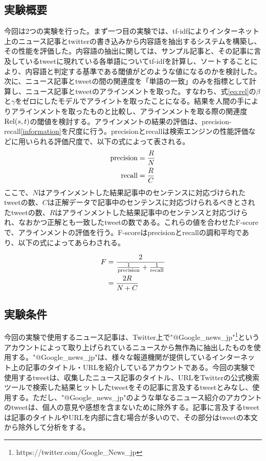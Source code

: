 \documentclass[12pt]{jarticle}
\begin{document}
\subsection{実験概要}
今回は2つの実験を行った。まず一つ目の実験では、tf-idfによりインターネット上のニュース記事とtwitterの書き込みから内容語を抽出するシステムを構築し、その性能を評価した。内容語の抽出に関しては、サンプル記事と、その記事に言及しているtweetに現れている各単語についてtf-idfを計算し、ソートすることにより、内容語と判定する基準である閾値がどのような値になるのかを検討した。次に、ニュース記事とtweetの間の関連度を「単語の一致」のみを指標として計算し、ニュース記事とtweetのアラインメントを取った。すなわち、式\ref{eq:rel}の$\beta$と$\gamma$をゼロにしたモデルでアライントを取ったことになる。結果を人間の手によりアラインメントを取ったものと比較し、アラインメントを取る際の関連度${\rm Rel}(s, t)$の閾値を検討する。アラインメントの結果の評価は、precision-recall\ref{information}を尺度に行う。precisionとrecallは検索エンジンの性能評価などに用いられる評価尺度で、以下の式によって表される。
\begin{align}
  {\rm precision} &= \frac{R}{N}\\
  {\rm recall} &= \frac{R}{C}
\end{align}
  ここで、$N$はアラインメントした結果記事中のセンテンスに対応づけられたtweetの数、$C$は正解データで記事中のセンテンスに対応づけられるべきとされたtweetの数、$R$はアラインメントした結果記事中のセンテンスと対応づけられ、なおかつ正解とも一致したtweetの数である。これらの値を合わせたF-scoreで、アラインメントの評価を行う。F-scoreはprecisionとrecallの調和平均であり、以下の式によってあらわされる。

\begin{align}
  F &= \frac{2}{\frac{1}{\rm precision} + \frac{1}{\rm recall}} \\
    &= \frac{2R}{N+C}
\end{align}


\subsection{実験条件}
今回の実験で使用するニュース記事は、Twitter上で"@Google\_news\_jp"\footnote{https://twitter.com/Google\_News\_jp}というアカウントによって取り上げられているニュースから無作為に抽出したものを使用する。"@Google\_news\_jp"は、様々な報道機関が提供しているインターネット上の記事のタイトル・URLを紹介しているアカウントである。今回の実験で使用するtweetは、収集したニュース記事のタイトル、URLをTwitterの公式検索ツールで検索した結果ヒットしたtweetをその記事に言及するtweetとみなし、使用する。ただし、"@Google\_news\_jp"のような単なるニュース紹介のアカウントのtweetは、個人の意見や感想を含まないために除外する。記事に言及するtweetは記事のタイトルやURLを内部に含む場合が多いので、その部分はtweetの本文から除外して分析をする。
\end{document}
